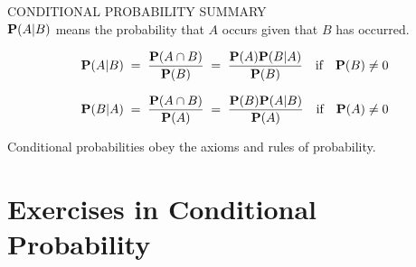 \begin{framed}
CONDITIONAL PROBABILITY SUMMARY\\

$\mathbf{P}(A|B)$ means the probability that $A$ occurs given that $B$ has
occurred.

$$\mathbf{P}(A|B)\;=\;\frac{\mathbf{P}(A\cap B)}{\mathbf{P}(B)}\;=\;\frac{\mathbf{P}(A)\mathbf{P}(B|A)}{\mathbf{P}(B)}\quad \textrm{if}\quad \mathbf{P}(B)\neq0$$

$$\mathbf{P}(B|A)\;=\;\frac{\mathbf{P}(A\cap B)}{\mathbf{P}(A)}\;=\;\frac{\mathbf{P}(B)\mathbf{P}(A|B)}{\mathbf{P}(A)}\quad \textrm{if}\quad \mathbf{P}(A)\neq 0$$

Conditional probabilities obey the axioms and rules of probability.
\end{framed}

\section{Exercises in Conditional Probability}\label{S:xsCondProb}

